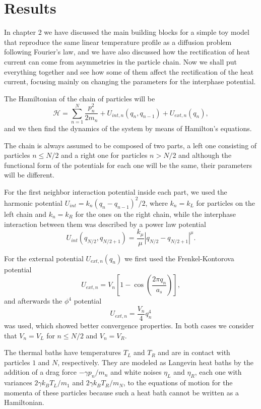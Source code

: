 
\chapter{Results}

In chapter 2 we have discussed the main building blocks for a simple toy model that reproduce the same linear temperature profile as a diffusion problem following Fourier's law, and we have also discussed how the rectification of heat current can come from asymmetries in the particle chain. Now we shall put everything together and see how some of them affect the rectification of the heat current, focusing mainly on changing the parameters for the interphase potential. 

The Hamiltonian of the chain of particles will be
\[ 
\mathcal{H} = \sum_{n=1}^{N}
\frac{p_{n}^{2} }{2m_{n} }
+ U_{int,n}(q_{n}, q_{n-1})
+ U_{ext,n}(q_{n}),
\]
and we then find the dynamics of the system by means of Hamilton's equations.

The chain is always assumed to be composed of two parts, a left one consisting of particles $ n\leq N/2 $ and a right one for particles $ n > N/2 $ and although the functional form of the potentials for each one will be the same, their parameters will be different.

For the first neighbor interaction potential inside each part, we used the harmonic potential $ U_{int} = k_{n}\left(q_{n}-q_{n-1}\right)^{2}/2 $, where $ k_{n}=k_{L} $ for particles on the left chain and $ k_{n}=k_{R} $ for the ones on the right chain, while the interphase interaction between them was described by a power law potential
\[
U_{int}(q_{N/2}, q_{N/2+1}) =  
\frac{k_{\mu} }{\mu }\left|q_{N/2}-q_{N/2+1}\right|^{\mu}.
\]

For the external potential $ U_{ext,n}(q_{n}) $ we first used the Frenkel-Kontorova potential 
\[ 
U_{ext,n} = V_{n}\left[1 - \cos \left( \frac{2\pi q_{n}}{a_{s}}\right)\right],
\]
and afterwards the $ \phi^{4} $ potential
\[ 
U_{ext,n} = \frac{V_{n}}{4}q_{n}^{4}
\]
was used, which showed better convergence properties. In both cases we consider that $ V_{n}=V_{L} $ for $ n\leq N/2 $ and $ V_{n}=V_{R} $.

The thermal baths have temperatures $ T_{L} $ and $ T_{R} $ and are in contact with particles $ 1 $ and $ N $, respectively. They are modeled as Langevin heat baths by the addition of a drag force $ -\gamma p_{n}/m_{n} $ and white noises $ \eta_{L} $ and $ \eta_{R} $, each one with variances $ 2\gamma k_{B}T_{L}/m_{1} $ and $ 2\gamma k_{B}T_{R}/m_{N} $, to the equations of motion for the momenta of these particles because such a heat bath cannot be written as a Hamiltonian.

